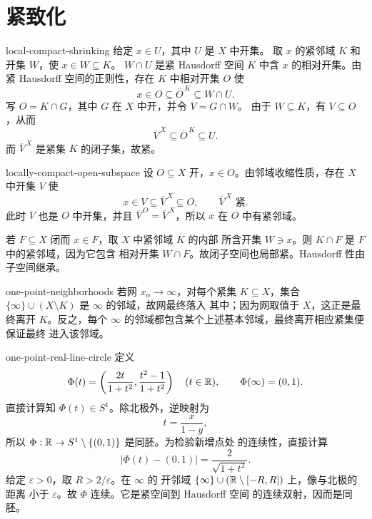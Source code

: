 \chapter{紧致化}
\label{chap:compactifications-solutions}

\begin{solution}{local-compact-shrinking}
给定 \(x\in U\)，其中 \(U\) 是 \(X\) 中开集。
取 \(x\) 的紧邻域 \(K\) 和开集 \(W\)，使 \(x\in W\subseteq K\)。
\(W\cap U\) 是紧 Hausdorff 空间 \(K\) 中含 \(x\) 的相对开集。由紧
Hausdorff 空间的正则性，存在 \(K\) 中相对开集 \(O\) 使
\[
 x\in O\subseteq\overline O^{\,K}\subseteq W\cap U.
\]
写 \(O=K\cap G\)，其中 \(G\) 在 \(X\) 中开，并令 \(V=G\cap W\)。
由于 \(W\subseteq K\)，有 \(V\subseteq O\)，从而
\[
 \overline V^{\,X}\subseteq\overline O^{\,K}\subseteq U.
\]
而 \(\overline V^{\,X}\) 是紧集 \(K\) 的闭子集，故紧。
\end{solution}

\begin{solution}{locally-compact-open-subspace}
设 \(O\subseteq X\) 开，\(x\in O\)。由邻域收缩性质，存在 \(X\) 中开集
\(V\) 使
\[
 x\in V\subseteq\overline V^{\,X}\subseteq O,
 \qquad \overline V^{\,X}\text{ 紧}.
\]
此时 \(V\) 也是 \(O\) 中开集，并且
\(\overline V^{\,O}=\overline V^{\,X}\)，所以 \(x\) 在 \(O\) 中有紧邻域。

若 \(F\subseteq X\) 闭而 \(x\in F\)，取 \(X\) 中紧邻域 \(K\) 的内部
所含开集 \(W\ni x\)。则 \(K\cap F\) 是 \(F\) 中的紧邻域，因为它包含
相对开集 \(W\cap F\)。故闭子空间也局部紧。Hausdorff 性由子空间继承。
\end{solution}

\begin{solution}{one-point-neighborhoods}
若网 \(x_\alpha\to\infty\)，对每个紧集 \(K\subseteq X\)，集合
\(\{\infty\}\cup(X\setminus K)\) 是 \(\infty\) 的邻域，故网最终落入
其中；因为网取值于 \(X\)，这正是最终离开 \(K\)。反之，每个
\(\infty\) 的邻域都包含某个上述基本邻域，最终离开相应紧集便保证最终
进入该邻域。
\end{solution}

\begin{solution}{one-point-real-line-circle}
定义
\[
 \Phi(t)=\left(\frac{2t}{1+t^2},\frac{t^2-1}{1+t^2}\right)
 \quad(t\in\mathbb{R}),
 \qquad \Phi(\infty)=(0,1).
\]
直接计算知 \(\Phi(t)\in S^1\)。除北极外，逆映射为
\[
 t=\frac{x}{1-y},
\]
所以 \(\Phi:\mathbb{R}\to S^1\setminus\{(0,1)\}\) 是同胚。为检验新增点处
的连续性，直接计算
\[
 |\Phi(t)-(0,1)|=\frac{2}{\sqrt{1+t^2}}.
\]
给定 \(\varepsilon>0\)，取 \(R>2/\varepsilon\)。在 \(\infty\) 的
开邻域 \(\{\infty\}\cup(\mathbb{R}\setminus[-R,R])\) 上，像与北极的距离
小于 \(\varepsilon\)。故 \(\Phi\) 连续。它是紧空间到 Hausdorff 空间
的连续双射，因而是同胚。
\end{solution}

